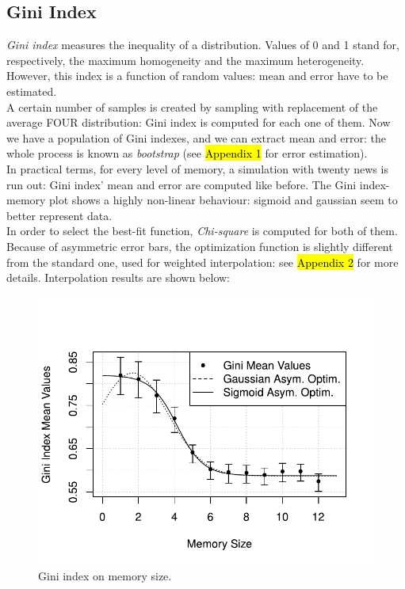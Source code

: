 \subsection{Gini Index}
\textit{Gini index}\cite{ginindex} measures the inequality of a
distribution. Values of 0 and 1 stand for, respectively, the
maximum homogeneity and the maximum heterogeneity.
However, this index is a function of random values: mean and
error have to be estimated.\\
A certain number of samples is created by sampling with replacement
of the average FOUR distribution: Gini index is computed for each
one of them.
Now we have a population of Gini indexes, and we can extract
mean and error: the whole process is known as
\textit{bootstrap}\cite{bootstrap}
(see \hl{Appendix 1} for error estimation).\\
In practical terms, for every level of  memory, a simulation with
twenty news is run out: Gini index' mean and error are computed
like before.
The Gini index-memory plot shows a highly non-linear behaviour:
sigmoid and gaussian seem to better represent data.\\
In order to select the best-fit function, \textit{Chi-square} is
computed for both of them. \\
Because of asymmetric error bars, the optimization function is
slightly different from the standard one, used for weighted
interpolation: see \hl{Appendix 2} for more details.
Interpolation results are shown below:





\begin{figure}[h]
  \centering
  \includegraphics[trim={0cm 0cm 0cm 1cm},clip,width=.8\columnwidth]{img/gini.pdf}
  \caption{Gini index on memory size.}
  \label{fig:gini}
\end{figure}

